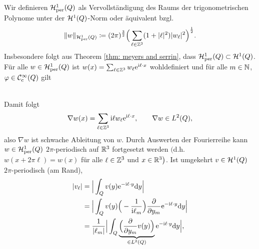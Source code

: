 Wir definieren \(\mathcal{H}_{\mathrm{per}}^1(Q)\) als Vervollständigung des Raums der trigonometrischen Polynome unter der \(\mathcal{H}^1(Q)\)-Norm oder äquivalent bzgl.
\begin{equation*}
	\|w\|_{\mathcal{H}_{\mathrm{per}}^1(Q)}\coloneqq(2\pi)^\frac{3}{2}\Big(\sum_{\ell\in\mathbb{Z}^3}(1+|\ell|^2)|w_\ell|^2\Big)^\frac{1}{2}.
\end{equation*}
Insbesondere folgt aus Theorem \ref{thm: meyers and serrin}, dass \(\mathcal{H}_{\mathrm{per}}^1(Q)\subset\mathcal{H}^1(Q)\). Für alle \(w\in\mathcal{H}_{\mathrm{per}}^1(Q)\) ist \(w(x)=\sum_{\ell\in\mathbb{Z}^3}w_\ell\mathrm{e}^{\mathrm{i}\ell\cdot x}\) wohldefiniert und für alle \(m\in\mathbb{N}\), \(\varphi\in\mathcal{C}_{\mathrm{c}}^\infty(Q)\) gilt
\begin{figure}[!h]
	\centering
\end{figure}\\
Damit folgt
\begin{equation}
	\label{darstellung von gradient von Hper^1 (ist in L^2)}
	\nabla w(x)= \sum_{\ell\in\mathbb{Z}^3}\mathrm{i}\ell w_\ell\mathrm{e}^{\mathrm{i}\ell\cdot x},\qquad \nabla w\in L^2(Q),
\end{equation}
also \(\nabla w\) ist schwache Ableitung von \(w\).
Durch Auswerten der Fourierreihe kann \(w\in\mathcal{H}_{\mathrm{per}}^1(Q)\) \(2\pi\)-periodisch auf \(\mathbb{R}^3\) fortgesetzt werden \(\big(\)d.h. \(w(x+2\pi\ell)=w(x)\) für alle \(\ell\in\mathbb{Z}^3\) und \(x\in\mathbb{R}^3\big)\). Ist umgekehrt \(v\in\mathcal{H}^1(Q)\) \(2\pi\)-periodisch (am Rand),
\begin{align*}
	|v_\ell|&=\Big|\int_Qv(y)\mathrm{e}^{-\mathrm{i}\ell\cdot y}\mathrm{d}y\Big|\\
	&=\Big|\int_Qv(y)\Big(-\frac{1}{\mathrm{i}\ell_m}\Big)\frac{\partial}{\partial y_m}\mathrm{e}^{-\mathrm{i}\ell\cdot y}\mathrm{d}y\Big|\\
	&=\frac{1}{|\ell_m|}\Big|\int_Q\underbrace{\Big(\frac{\partial}{\partial y_m}v(y)\Big)}_{\in L^2(Q)}\mathrm{e}^{-\mathrm{i}\ell\cdot y}\mathrm{d}y\Big|,
\end{align*}
